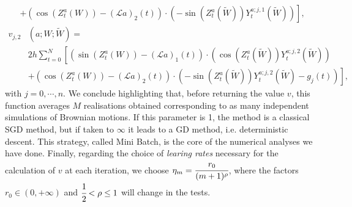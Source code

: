 \documentclass[a4paper,11pt,openright]{report}
\begin{document}
\begin{itemize}
\begin{align*}
&\left.+ \left( \cos(Z^a_t(W)) - (\mathcal{L}a)_2(t) \right) \cdot \left( -\sin(Z^a_t(\tilde{W})) Y_t^{a;j,1}(\tilde{W}) \right)\right],
\end{align*}
\begin{align*}
v_{j,2}&(a; W; \tilde{W}) = \\
&2 h \sum_{t=0}^{N} \left[ \left( \sin(Z^a_t(W)) - (\mathcal{L}a)_1(t) \right) \cdot \left( \cos(Z^a_t(\tilde{W})) Y_t^{a;j,2}(\tilde{W}) \right) \right.\\
&\left.+ \left( \cos(Z^a_t(W)) - (\mathcal{L}a)_2(t) \right) \cdot \left( -\sin(Z^a_t(\tilde{W})) Y_t^{a;j,2}(\tilde{W}) - g_j(t) \right)\right],
\end{align*}
with $j = 0, \cdots , n$. We conclude highlighting that, before returning the value $v$, this function averages $M$ realisations obtained corresponding to as many independent simulations of Brownian motions. If this parameter is 1, the method is a classical SGD method, but if taken to $\infty$ it leads to a GD method, i.e. deterministic descent. This strategy, called Mini Batch, is the core of the numerical analyses we have done. Finally, regarding the choice of \emph{learing  rates} necessary for the calculation of $v$ at each iteration, we choose $\eta_m = \cfrac{r_0}{(m + 1)^\rho}$, where the factors $r_0 \in (0, +\infty)$ and $\cfrac{1}{2} < \rho \leq 1$ will change in the tests.
\end{itemize}
\end{document}
